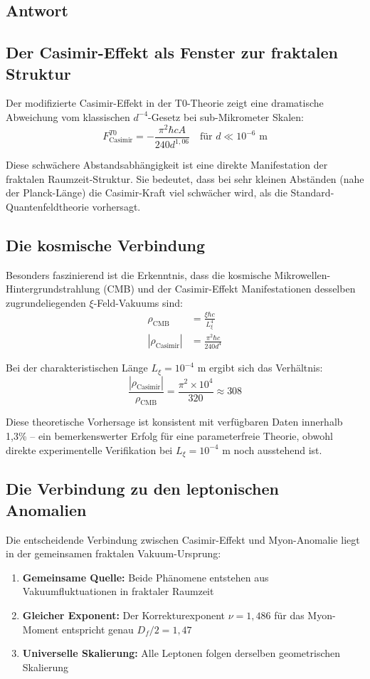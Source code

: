 \documentclass[12pt,a4paper]{article}
\newcommand{\nulep}{\nu}
\theoremstyle{remark}
\newenvironment{answer}{\subsection*{Antwort}}{\vspace{1em}}
\begin{document}
\begin{answer}
	\subsection{Der Casimir-Effekt als Fenster zur fraktalen Struktur}
	
	Der modifizierte Casimir-Effekt in der T0-Theorie zeigt eine dramatische Abweichung vom klassischen $d^{-4}$-Gesetz bei sub-Mikrometer Skalen:
	\begin{equation}
		F_{\text{Casimir}}^{T0} = -\frac{\pi^2 \hbar c A}{240 d^{1{,}06}} \quad \text{für } d \ll 10^{-6} \text{ m}
	\end{equation}
	
	Diese schwächere Abstandsabhängigkeit ist eine direkte Manifestation der fraktalen Raumzeit-Struktur. Sie bedeutet, dass bei sehr kleinen Abständen (nahe der Planck-Länge) die Casimir-Kraft viel schwächer wird, als die Standard-Quantenfeldtheorie vorhersagt.
	
	\subsection{Die kosmische Verbindung}
	
	Besonders faszinierend ist die Erkenntnis, dass die kosmische Mikrowellen-Hintergrundstrahlung (CMB) und der Casimir-Effekt Manifestationen desselben zugrundeliegenden $\xi$-Feld-Vakuums sind:
	\begin{align}
		\rho_{\text{CMB}} &= \frac{\xi \hbar c}{L_\xi^4} \\
		|\rho_{\text{Casimir}}| &= \frac{\pi^2 \hbar c}{240d^4}
	\end{align}
	
	Bei der charakteristischen Länge $L_\xi = 10^{-4}$ m ergibt sich das Verhältnis:
	\begin{equation}
		\frac{|\rho_{\text{Casimir}}|}{\rho_{\text{CMB}}} = \frac{\pi^2 \times 10^4}{320} \approx 308
	\end{equation}
	
	Diese theoretische Vorhersage ist konsistent mit verfügbaren Daten innerhalb 1{,}3\% -- ein bemerkenswerter Erfolg für eine parameterfreie Theorie, obwohl direkte experimentelle Verifikation bei $L_\xi = 10^{-4}$ m noch ausstehend ist.
	
	\subsection{Die Verbindung zu den leptonischen Anomalien}
	
	Die entscheidende Verbindung zwischen Casimir-Effekt und Myon-Anomalie liegt in der gemeinsamen fraktalen Vakuum-Ursprung:
	\begin{enumerate}
		\item \textbf{Gemeinsame Quelle:} Beide Phänomene entstehen aus Vakuumfluktuationen in fraktaler Raumzeit
		\item \textbf{Gleicher Exponent:} Der Korrekturexponent $\nulep = 1{,}486$ für das Myon-Moment entspricht genau $D_f/2 = 1{,}47$
		\item \textbf{Universelle Skalierung:} Alle Leptonen folgen derselben geometrischen Skalierung
	\end{enumerate}
	

\end{answer}
\end{document}
